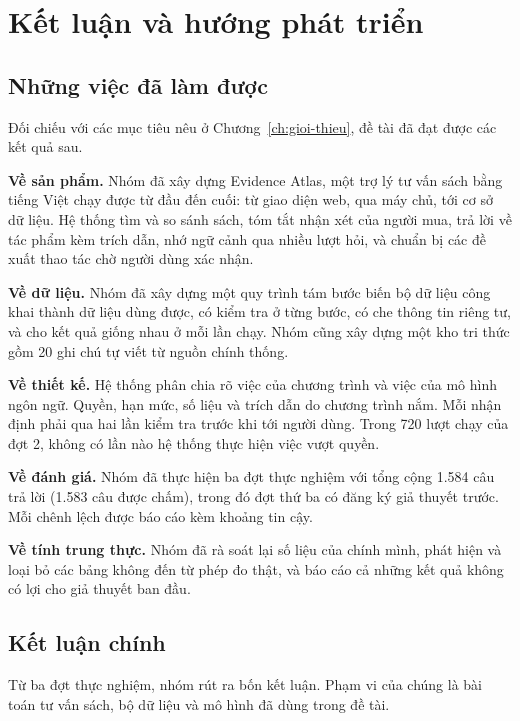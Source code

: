 \chapter{Kết luận và hướng phát triển}
\label{ch:ket-luan}

\section{Những việc đã làm được}

Đối chiếu với các mục tiêu nêu ở Chương~\ref{ch:gioi-thieu}, đề tài đã đạt được các kết quả sau.

\textbf{Về sản phẩm.} Nhóm đã xây dựng Evidence Atlas, một trợ lý tư vấn sách bằng tiếng Việt chạy được từ đầu đến cuối: từ giao diện web, qua máy chủ, tới cơ sở dữ liệu. Hệ thống tìm và so sánh sách, tóm tắt nhận xét của người mua, trả lời về tác phẩm kèm trích dẫn, nhớ ngữ cảnh qua nhiều lượt hỏi, và chuẩn bị các đề xuất thao tác chờ người dùng xác nhận.

\textbf{Về dữ liệu.} Nhóm đã xây dựng một quy trình tám bước biến bộ dữ liệu công khai thành dữ liệu dùng được, có kiểm tra ở từng bước, có che thông tin riêng tư, và cho kết quả giống nhau ở mỗi lần chạy. Nhóm cũng xây dựng một kho tri thức gồm 20 ghi chú tự viết từ nguồn chính thống.

\textbf{Về thiết kế.} Hệ thống phân chia rõ việc của chương trình và việc của mô hình ngôn ngữ. Quyền, hạn mức, số liệu và trích dẫn do chương trình nắm. Mỗi nhận định phải qua hai lần kiểm tra trước khi tới người dùng. Trong 720 lượt chạy của đợt 2, không có lần nào hệ thống thực hiện việc vượt quyền.

\textbf{Về đánh giá.} Nhóm đã thực hiện ba đợt thực nghiệm với tổng cộng 1.584 câu trả lời (1.583 câu được chấm), trong đó đợt thứ ba có đăng ký giả thuyết trước. Mỗi chênh lệch được báo cáo kèm khoảng tin cậy.

\textbf{Về tính trung thực.} Nhóm đã rà soát lại số liệu của chính mình, phát hiện và loại bỏ các bảng không đến từ phép đo thật, và báo cáo cả những kết quả không có lợi cho giả thuyết ban đầu.

\section{Kết luận chính}

Từ ba đợt thực nghiệm, nhóm rút ra bốn kết luận. Phạm vi của chúng là bài toán tư vấn sách, bộ dữ liệu và mô hình đã dùng trong đề tài.

